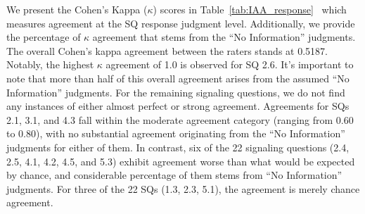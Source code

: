 \documentclass[sn-mathphys,Numbered]{sn-jnl}%
\theoremstyle{thmstyleone}%
\theoremstyle{thmstyletwo}%
\theoremstyle{thmstylethree}%
\begin{document}
We present the Cohen's Kappa ($\kappa$) scores in Table~\ref{tab:IAA_response}~\cite{mchugh2012interrater} which measures agreement at the SQ response judgment level.
Additionally, we provide the percentage of $\kappa$ agreement that stems from the ``No Information'' judgments.
The overall Cohen's kappa agreement between the raters stands at 0.5187.
Notably, the highest $\kappa$ agreement of 1.0 is observed for SQ 2.6.
It's important to note that more than half of this overall agreement arises from the assumed ``No Information'' judgments.
For the remaining signaling questions, we do not find any instances of either almost perfect or strong agreement.
Agreements for SQs 2.1, 3.1, and 4.3 fall within the moderate agreement category (ranging from 0.60 to 0.80), with no substantial agreement originating from the ``No Information'' judgments for either of them.
In contrast, six of the 22 signaling questions (2.4, 2.5, 4.1, 4.2, 4.5, and 5.3) exhibit agreement worse than what would be expected by chance, and considerable percentage of them stems from ``No Information'' judgments.
For three of the 22 SQs (1.3, 2.3, 5.1), the agreement is merely chance agreement.
\end{document}
